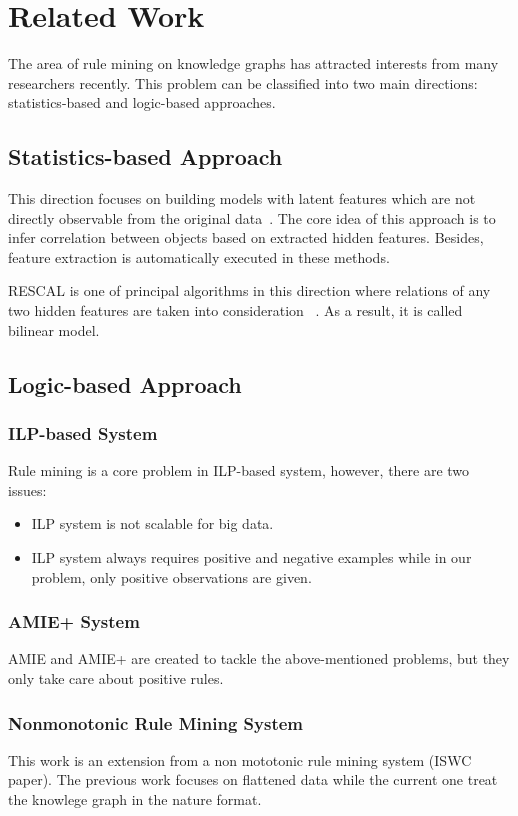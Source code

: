\chapter{Related Work}

The area of rule mining on knowledge graphs has attracted interests from many researchers recently. This problem can be classified into two main directions: statistics-based and logic-based approaches.

\section{Statistics-based Approach}

This direction focuses on building models with latent features which are not directly observable from the original data~\cite{ref1}. The core idea of this approach is to infer correlation between objects based on extracted hidden features. Besides, feature extraction is automatically executed in these methods.

RESCAL is one of principal algorithms in this direction where relations of any two hidden features are taken into consideration ~\cite{ref2, ref3, ref4}. As a result, it is called bilinear model.

\section{Logic-based Approach}

\subsection{ILP-based System}

Rule mining is a core problem in ILP-based system, however, there are two issues:

\begin{itemize}
	\item ILP system is not scalable for big data.
	\item ILP system always requires positive and negative examples while in our problem, only positive observations are given.
\end{itemize}

\subsection{AMIE+ System}

AMIE and AMIE+ are created to tackle the above-mentioned problems, but they only take care about positive rules.

\subsection{Nonmonotonic Rule Mining System}

This work is an extension from a non mototonic rule mining system (ISWC paper). The previous work focuses on flattened data while the current one treat the knowlege graph in the nature format.
